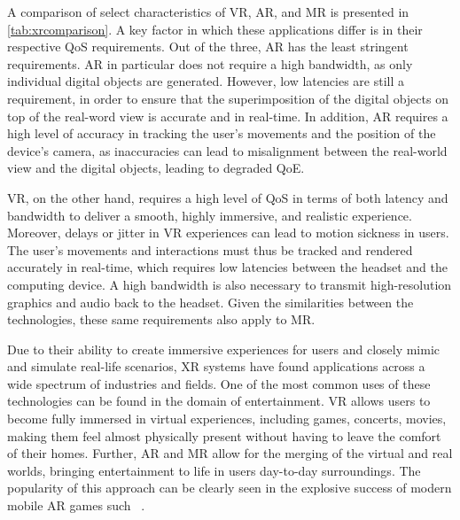

A comparison of select characteristics of \gls{VR}, \gls{AR}, and \gls{MR} is presented in \cref{tab:xrcomparison}.
A key factor in which these applications differ is in their respective \gls{QoS} requirements.
Out of the three, \gls{AR} has the least stringent requirements.
\gls{AR} in particular does not require a high bandwidth, as only individual digital objects are generated.
However, low latencies are still a requirement, in order to ensure that the superimposition of the digital objects on top of the real-word view is accurate and in real-time.
In addition, \gls{AR} requires a high level of accuracy in tracking the user's movements and the position of the device's camera, as inaccuracies can lead to misalignment between the real-world view and the digital objects, leading to degraded \gls{QoE}.

\gls{VR}, on the other hand, requires a high level of \gls{QoS} in terms of both latency and bandwidth to deliver a smooth, highly immersive, and realistic experience.
Moreover, delays or jitter in \gls{VR} experiences can lead to motion sickness in users.
The user's movements and interactions must thus be tracked and rendered accurately in real-time, which requires low latencies between the headset and the computing device.
A high bandwidth is also necessary to transmit high-resolution graphics and audio back to the headset.
Given the similarities between the technologies, these same requirements also apply to \gls{MR}.

\medskip

Due to their ability to create immersive experiences for users and closely mimic and simulate real-life scenarios, \gls{XR} systems have found applications across a wide spectrum of industries and fields.
One of the most common uses of these technologies can be found in the domain of entertainment.
\gls{VR} allows users to become fully immersed in virtual experiences, including games, concerts, movies, making them feel almost physically present without having to leave the comfort of their homes.
Further, \gls{AR} and \gls{MR} allow for the merging of the virtual and real worlds, bringing entertainment to life in users day-to-day surroundings.
The popularity of this approach can be clearly seen in the explosive success of modern mobile \gls{AR} games such ~\cite{pokemongo}.

